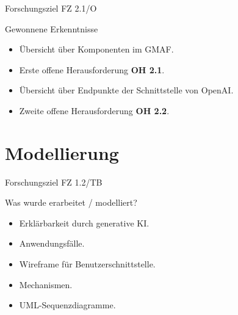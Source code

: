 \documentclass[t]{beamer}
\begin{document}
\begin{frame}{Forschungsziel FZ 2.1/O}
  \begin{block}{Gewonnene Erkenntnisse}
    \begin{itemize}
      \item<+-> Übersicht über Komponenten im GMAF.
      \item<+-> Erste offene Herausforderung \textbf{OH 2.1}.
      \item<+-> Übersicht über Endpunkte der Schnittstelle von OpenAI.
      \item<+-> Zweite offene Herausforderung \textbf{OH 2.2}.
    \end{itemize}
  \end{block}
\end{frame}

\section{Modellierung}


\begin{frame}{Forschungsziel FZ 1.2/TB}
  \begin{block}{Was wurde erarbeitet / modelliert?}
    \begin{itemize}
      \item<+-> Erklärbarkeit durch generative KI.
      \item<+-> Anwendungsfälle.
      \item<+-> Wireframe für Benutzerschnittstelle.
      \item<+-> Mechanismen.
      \item<+-> UML-Sequenzdiagramme.
    \end{itemize}
  \end{block}
\end{frame}
\end{document}
